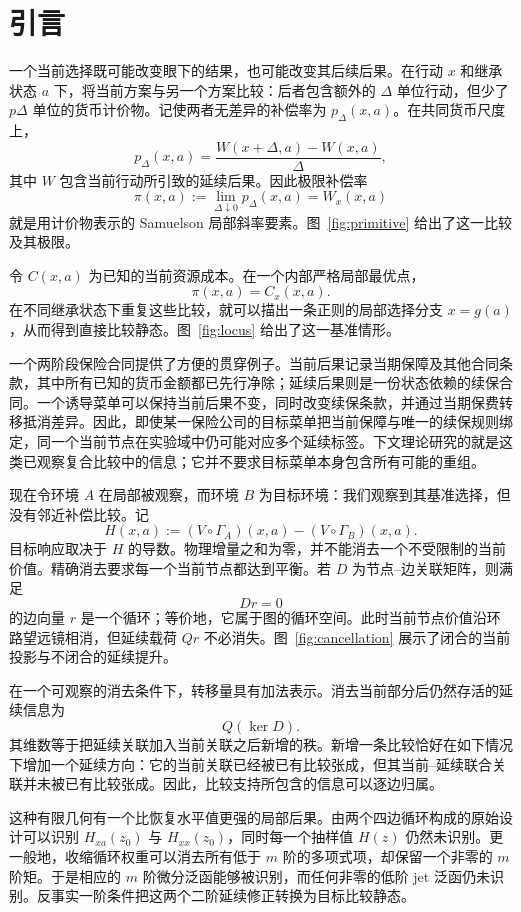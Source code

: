 \section{引言}

一个当前选择既可能改变眼下的结果，也可能改变其后续后果。在行动 $x$ 和继承状态 $a$ 下，将当前方案与另一个方案比较：后者包含额外的 $\Delta$ 单位行动，但少了 $p\Delta$ 单位的货币计价物。记使两者无差异的补偿率为 $p_\Delta(x,a)$。在共同货币尺度上，
\[
p_\Delta(x,a)
=
\frac{W(x+\Delta,a)-W(x,a)}{\Delta},
\]
其中 $W$ 包含当前行动所引致的延续后果。因此极限补偿率
\[
\pi(x,a):=\lim_{\Delta\downarrow0}p_\Delta(x,a)=W_x(x,a)
\]
就是用计价物表示的 Samuelson 局部斜率要素。图~\ref{fig:primitive} 给出了这一比较及其极限。

令 $C(x,a)$ 为已知的当前资源成本。在一个内部严格局部最优点，
\[
\pi(x,a)=C_x(x,a).
\]
在不同继承状态下重复这些比较，就可以描出一条正则的局部选择分支 $x=g(a)$，从而得到直接比较静态。图~\ref{fig:locus} 给出了这一基准情形。

一个两阶段保险合同提供了方便的贯穿例子。当前后果记录当期保障及其他合同条款，其中所有已知的货币金额都已先行净除；延续后果则是一份状态依赖的续保合同。一个诱导菜单可以保持当前后果不变，同时改变续保条款，并通过当期保费转移抵消差异。因此，即使某一保险公司的目标菜单把当前保障与唯一的续保规则绑定，同一个当前节点在实验域中仍可能对应多个延续标签。下文理论研究的就是这类已观察复合比较中的信息；它并不要求目标菜单本身包含所有可能的重组。

现在令环境 $A$ 在局部被观察，而环境 $B$ 为目标环境：我们观察到其基准选择，但没有邻近补偿比较。记
\[
H(x,a):=(V\circ\Gamma_A)(x,a)-(V\circ\Gamma_B)(x,a).
\]
目标响应取决于 $H$ 的导数。物理增量之和为零，并不能消去一个不受限制的当前价值。精确消去要求每一个当前节点都达到平衡。若 $D$ 为节点--边关联矩阵，则满足
\[
Dr=0
\]
的边向量 $r$ 是一个循环；等价地，它属于图的循环空间。此时当前节点价值沿环路望远镜相消，但延续载荷 $Qr$ 不必消失。图~\ref{fig:cancellation} 展示了闭合的当前投影与不闭合的延续提升。

在一个可观察的消去条件下，转移量具有加法表示。消去当前部分后仍然存活的延续信息为
\[
Q(\ker D).
\]
其维数等于把延续关联加入当前关联之后新增的秩。新增一条比较恰好在如下情况下增加一个延续方向：它的当前关联已经被已有比较张成，但其当前--延续联合关联并未被已有比较张成。因此，比较支持所包含的信息可以逐边归属。

这种有限几何有一个比恢复水平值更强的局部后果。由两个四边循环构成的原始设计可以识别 $H_{xa}(z_0)$ 与 $H_{xx}(z_0)$，同时每一个抽样值 $H(z)$ 仍然未识别。更一般地，收缩循环权重可以消去所有低于 $m$ 阶的多项式项，却保留一个非零的 $m$ 阶矩。于是相应的 $m$ 阶微分泛函能够被识别，而任何非零的低阶 jet 泛函仍未识别。反事实一阶条件把这两个二阶延续修正转换为目标比较静态。


